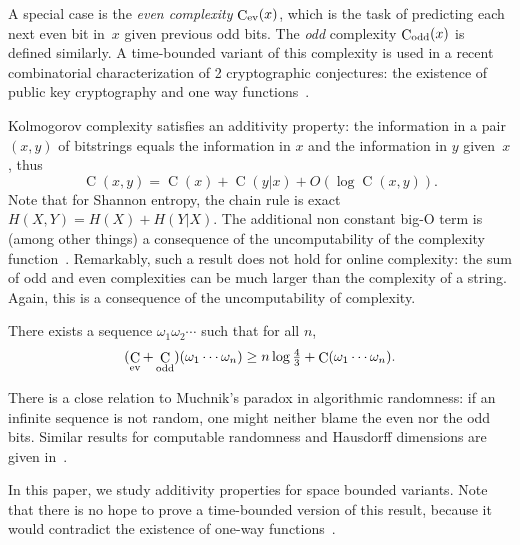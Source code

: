 \documentclass[runningheads]{llncs}
\DeclareMathOperator{\C}{C} \newcommand{\Cev}{\C_\textnormal{ev}} \newcommand{\Codd}{\C_\textnormal{odd}}
\begin{document}
A special case is the {\em even complexity} $\Cev(x)$, which is the task of predicting each next even bit in~$x$ given previous odd bits. 
The {\em odd} complexity $\Codd(x)$ is defined similarly. %
A time-bounded variant of this complexity is used in a recent combinatorial characterization of 2 cryptographic conjectures:
the existence of public key cryptography and one way functions~\cite{Ball2023Kolmogorov}.  


Kolmogorov complexity satisfies an additivity property: the information in a pair $(x,y)$ of bitstrings equals the information in $x$ and the information in $y$ given~$x$, thus 
\begin{equation}\label{eq:symmetry}\tag{$*$}
 \C(x,y) = \C(x) + \C(y|x) + O(\log \C(x,y)). 
\end{equation}
Note that for Shannon entropy, the chain rule is exact $H(X,Y) = H(X) + H(Y|X)$. 
The additional non constant big-O term is (among other things) a consequence of the uncomputability of the complexity function~\cite{BauwensCompcomp,complexityOfComplexity}.  
Remarkably, such a result does not hold for online complexity: the sum of odd and even complexities can be much larger than the complexity of a string. 
Again, this is a consequence of the uncomputability of complexity. 

\begin{theorem}\label{th:BauwensOnline}
  There exists a sequence $\omega_1 \omega_2 \cdots$ such that for all $n$, 
  \[
    (\Cev + \Codd)(\omega_1 \cdots \omega_n) \ge n \log \tfrac 4 3 + \C(\omega_1 \cdots \omega_n). 
  \]
\end{theorem}

There is a close relation to Muchnik's paradox \cite{MuchnikOnline} in algorithmic randomness: 
if an infinite sequence is not random, one might neither blame the even nor the odd bits. 
Similar results for computable randomness and Hausdorff dimensions are given in~\cite{Barmpalias2021irreducibility,Barmpalias2022aspects}. 

In this paper, we study additivity properties for space bounded variants. 
Note that there is no hope to prove a time-bounded version of this result, because it would contradict the existence of one-way functions~\cite{Hirahara2023duality,Longpre1986PhD,Longpre1993symmetry}. 
\end{document}
